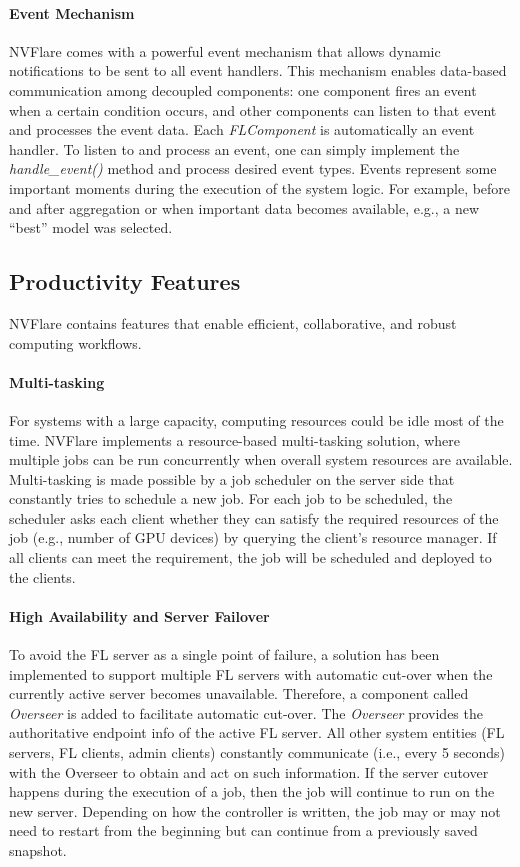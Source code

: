 \documentclass[11pt]{article}
\begin{document}
\paragraph{Event Mechanism} NVFlare comes with a powerful event mechanism that allows dynamic notifications to be sent to all event handlers. This mechanism enables data-based communication among decoupled components: one component fires an event when a certain condition occurs, and other components can listen to that event and processes the event data. Each \textit{FLComponent} is automatically an event handler. To listen to and process an event, one can simply implement the \textit{handle\_event()} method and process desired event types. Events represent some important moments during the execution of the system logic. For example, before and after aggregation or when important data becomes available, e.g., a new ``best'' model was selected.
%
\subsection{Productivity Features}
NVFlare contains features that enable efficient, collaborative, and robust computing workflows.

\paragraph{Multi-tasking} For systems with a large capacity, computing resources could be idle most of the time. NVFlare implements a resource-based multi-tasking solution, where multiple jobs can be run concurrently when overall system resources are available.
Multi-tasking is made possible by a job scheduler on the server side that constantly tries to schedule a new job.
For each job to be scheduled, the scheduler asks each client whether they can satisfy the required resources of the job (e.g., number of GPU devices) by querying the client's resource manager. If all clients can meet the requirement, the job will be scheduled and deployed to the clients.

\paragraph{High Availability and Server Failover} To avoid the FL server as a single point of failure, a solution has been implemented to support multiple FL servers with automatic cut-over when the currently active server becomes unavailable.
Therefore, a component called \textit{Overseer} is added to facilitate automatic cut-over. The \textit{Overseer} provides the authoritative endpoint info of the active FL server. All other system entities (FL servers, FL clients, admin clients) constantly communicate (i.e., every 5 seconds) with the Overseer to obtain and act on such information.
%
If the server cutover happens during the execution of a job, then the job will continue to run on the new server. Depending on how the controller is written, the job may or may not need to restart from the beginning but can continue from a previously saved snapshot.
\end{document}
